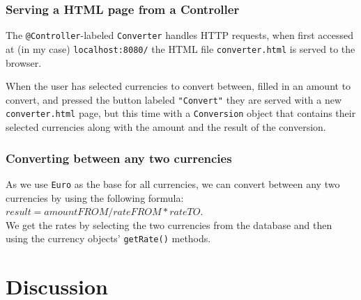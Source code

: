 \documentclass[a4paper]{scrartcl}
\begin{document}
\subsubsection{Serving a HTML page from a Controller}
The \texttt{@Controller}-labeled \texttt{Converter} handles HTTP requests, when first accessed at (in my case) \texttt{localhost:8080/} the HTML file \texttt{converter.html} is served to the browser.

When the user has selected currencies to convert between, filled in an amount to convert, and pressed the button labeled \texttt{"Convert"} they are served with a new \texttt{converter.html} page, but this time with a \texttt{Conversion} object that contains their selected currencies along with the amount and the result of the conversion.


\subsubsection{Converting between any two currencies}
As we use \texttt{Euro} as the base for all currencies, we can convert between any two currencies by using the following formula: $result = amountFROM / rateFROM * rateTO$.\\
We get the rates by selecting the two currencies from the database and then using the currency objects' \texttt{getRate()} methods.



\section{Discussion}
\end{document}
